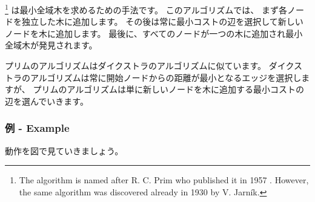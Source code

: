 
\footnote{The algorithm is
named after R. C. Prim who published it in 1957 \cite{pri57}.
However, the same algorithm was discovered already in 1930
by V. Jarník.} 
は最小全域木を求めるための手法です。
このアルゴリズムでは、
まず各ノードを独立した木に追加します。
その後は常に最小コストの辺を選択して新しいノードを木に追加します。
最後に、すべてのノードが一つの木に追加され最小全域木が発見されます。

プリムのアルゴリズムはダイクストラのアルゴリズムに似ています。
ダイクストラのアルゴリズムは常に開始ノードからの距離が最小となるエッジを選択しますが、
プリムのアルゴリズムは単に新しいノードを木に追加する最小コストの辺を選んでいきます。

\subsubsection{例 - Example}

動作を図で見ていきましょう。

